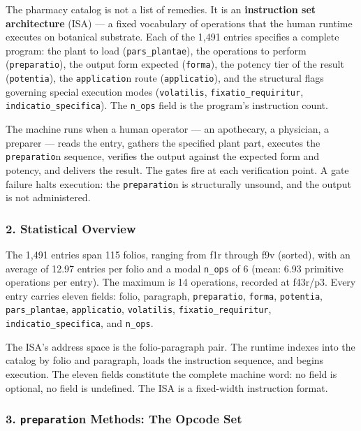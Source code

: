 The pharmacy catalog is not a list of remedies. It is an
\textbf{instruction set architecture} (ISA) --- a fixed vocabulary of
operations that the human runtime executes on botanical substrate. Each
of the 1,491 entries specifies a complete program: the plant to load
(\texttt{pars\_plantae}), the operations to perform
(\texttt{preparatio}), the output form expected (\texttt{forma}), the
potency tier of the result (\texttt{potentia}), the \texttt{applicatio}n
route (\texttt{applicatio}), and the structural flags governing special
execution modes (\texttt{volatilis}, \texttt{fixatio\_requiritur},
\texttt{indicatio\_specifica}). The \texttt{n\_ops} field is the
program's instruction count.

The machine runs when a human operator --- an apothecary, a physician, a
preparer --- reads the entry, gathers the specified plant part, executes
the \texttt{preparatio}n sequence, verifies the output against the
expected form and potency, and delivers the result. The gates fire at
each verification point. A gate failure halts execution: the
\texttt{preparatio}n is structurally unsound, and the output is not
administered.

\hypertarget{statistical-overview}{%
\subsubsection{2. Statistical Overview}\label{statistical-overview}}

The 1,491 entries span 115 folios, ranging from f1r through f9v
(sorted), with an average of 12.97 entries per folio and a modal
\texttt{n\_ops} of 6 (mean: 6.93 primitive operations per entry). The
maximum is 14 operations, recorded at f43r/p3. Every entry carries
eleven fields: folio, paragraph, \texttt{preparatio}, \texttt{forma},
\texttt{potentia}, \texttt{pars\_plantae}, \texttt{applicatio},
\texttt{volatilis}, \texttt{fixatio\_requiritur},
\texttt{indicatio\_specifica}, and \texttt{n\_ops}.

The ISA's address space is the folio-paragraph pair. The runtime indexes
into the catalog by folio and paragraph, loads the instruction sequence,
and begins execution. The eleven fields constitute the complete machine
word: no field is optional, no field is undefined. The ISA is a
fixed-width instruction format.

\hypertarget{preparation-methods-the-opcode-set}{%
\subsubsection{\texorpdfstring{3. \texttt{preparatio}n Methods: The
Opcode
Set}{3. preparation Methods: The Opcode Set}}\label{preparation-methods-the-opcode-set}}

